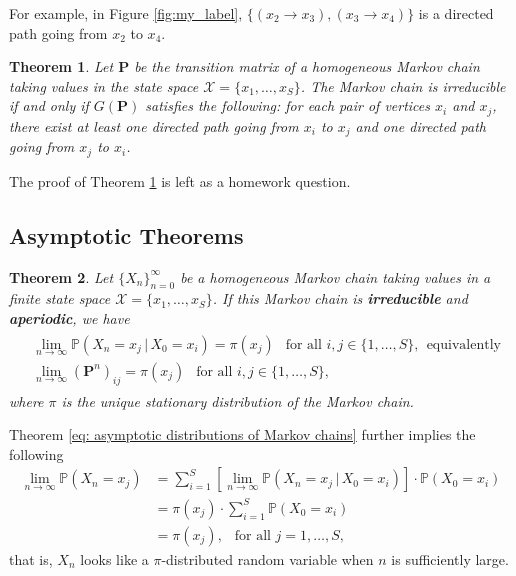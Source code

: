 \documentclass[11pt,letterpaper, leqno]{article}
\newtheorem{theorem}{Theorem}
\numberwithin{equation}{section}
\numberwithin{theorem}{section}
\numberwithin{lemma}{section}
\numberwithin{corollary}{section}
\numberwithin{definition}{section}
\numberwithin{proposition}{section}
\numberwithin{remark}{section}
\numberwithin{example}{section}
\begin{document}
\noindent For example, in Figure \ref{fig:my_label}, $\{(x_2\rightarrow x_3), (x_3\rightarrow x_4)\}$ is a directed path going from $x_2$ to $x_4$.

\begin{theorem}\label{thm: irreducibility from the graphical perspective}
Let $\boldsymbol{P}$ be the transition matrix of a homogeneous Markov chain taking values in the state space $\mathcal{X}=\{x_1,\ldots,x_S\}$. The Markov chain is irreducible if and only if $G(\boldsymbol{P})$ satisfies the following: for each pair of vertices $x_i$ and $x_j$, there exist at least one directed path going from $x_i$ to $x_j$ and one directed path going from  $x_j$ to $x_i$.
\end{theorem}
\noindent The proof of Theorem \ref{thm: irreducibility from the graphical perspective} is left as a homework question.


\subsection{Asymptotic Theorems}

\begin{theorem}\label{thm: asymptotic distributions of MCs}
Let $\{X_n\}_{n=0}^\infty$ be a homogeneous Markov chain taking values in a finite state space $\mathcal{X}=\{x_1,\ldots,x_S\}$. If this Markov chain is \textbf{irreducible} and \textbf{aperiodic}, we have 
\begin{align}\label{eq: asymptotic distributions of Markov chains}
    \begin{aligned}
    & \lim_{n\rightarrow\infty}\mathbb{P}(X_n=x_j \,\vert\, X_0=x_i)=\pi(x_j) \ \ \text{ for all }i,j\in\{1,\ldots,S\},\ \ \mbox{equivalently} \\
    & \lim_{n\rightarrow\infty} (\boldsymbol{P}^n)_{ij}=\pi(x_j) \ \ \text{ for all }i,j\in\{1,\ldots,S\},
    \end{aligned}
\end{align}
where $\pi$ is the unique stationary distribution of the Markov chain.
\end{theorem}
\noindent Theorem \ref{eq: asymptotic distributions of Markov chains} further implies the following
\begin{align*}
    \lim_{n\rightarrow\infty}\mathbb{P}(X_n=x_j) 
    & =\sum_{i=1}^S \left[\lim_{n\rightarrow\infty}\mathbb{P}(X_n=x_j \,\vert\, X_0=x_i)\right]\cdot \mathbb{P}(X_0=x_i) \\
    & = \pi(x_j) \cdot \sum_{i=1}^S \mathbb{P}(X_0=x_i) \\
    & = \pi(x_j),\ \ \mbox{ for all }j=1,\ldots,S,
\end{align*}
that is, $X_n$ looks like a $\pi$-distributed random variable when $n$ is sufficiently large.
\end{document}
